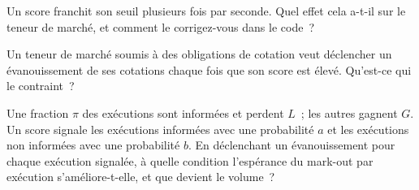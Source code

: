 \begin{interviewq}\label{iq:hf:adverse-selection-and-toxicity:4}
Un score franchit son seuil plusieurs fois par seconde. Quel effet cela a-t-il sur le teneur de marché, et comment le corrigez-vous dans le code~?
\end{interviewq}

\begin{interviewq}\label{iq:hf:adverse-selection-and-toxicity:5}
Un teneur de marché soumis à des obligations de cotation veut déclencher un évanouissement de ses cotations chaque fois que son score est élevé. Qu'est-ce qui le contraint~?
\end{interviewq}

\begin{interviewq}\label{iq:hf:adverse-selection-and-toxicity:6}
Une fraction $\pi$ des exécutions sont informées et perdent $L$~; les autres gagnent $G$. Un score signale les exécutions informées avec une probabilité $a$ et les exécutions non informées avec
une probabilité $b$. En déclenchant un évanouissement pour chaque exécution signalée, à quelle condition l'espérance du mark-out par exécution s'améliore-t-elle, et que devient le volume~?
\end{interviewq}
